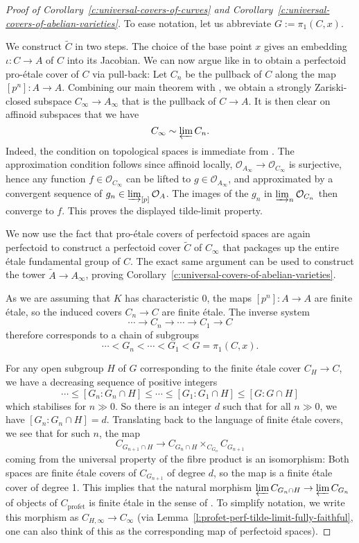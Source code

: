 \documentclass[10pt,oneside]{amsart}
\theoremstyle{definition}
\newcommand{\profet}{\operatorname{prof\acute{e}t}}
\begin{document}
\begin{proof}[Proof of Corollary~\ref{c:universal-covers-of-curves} and Corollary~\ref{c:universal-covers-of-abelian-varieties}]
To ease notation, let us abbreviate $G:=\pi_1(C,x)$.
	
We construct $\widetilde{C}$ in two steps. 
The choice of the base point $x$ gives an embedding $\iota\colon C\rightarrow A$ of $C$ into its Jacobian. We can now argue like in \cite[\S4.1]{torsion} to obtain a perfectoid pro-\'etale cover of $C$ via pull-back: Let $C_n$ be the pullback of $C$ along the map $[p^n]\colon A\rightarrow A$. Combining our main theorem with \cite[Lemma 2.2.2]{torsion}, we obtain a strongly Zariski-closed subspace $C_\infty\to A_\infty$ that is the pullback of $C\to A$. It is then clear on affinoid subspaces that we have \[C_\infty\sim \varprojlim C_n.\]
Indeed, the condition on topological spaces is immediate from \cite[Lemma 2.2.2]{torsion}. The approximation condition follows since affinoid locally, $\mathcal O_{A_\infty}\to \mathcal O_{C_\infty}$ is surjective, hence any function $f\in \mathcal O_{C_\infty}$ can be lifted to $g\in \mathcal O_{A_\infty}$, and approximated by a convergent sequence of $g_n\in\varinjlim_{[p]}\mathcal O_{A}$. The images of the $g_n$ in $\varinjlim_n\mathcal O_{C_n}$ then converge to $f$. This proves the displayed tilde-limit property.

We now use the fact that pro-\'etale covers of perfectoid spaces are again perfectoid to construct a perfectoid cover $\widetilde{C}$ of $C_\infty$ that packages up the entire \'etale fundamental group of $C$. The exact same argument can be used to construct the tower $\widetilde{A}\to A_\infty$, proving Corollary~\ref{c:universal-covers-of-abelian-varieties}.

As we are assuming that $K$ has characteristic 0, the maps $[p^n]\colon A\rightarrow A$ are finite \'etale, so the induced covers $C_n\rightarrow C$ are finite \'etale. The inverse system 
\[\cdots \rightarrow C_n \rightarrow \cdots \rightarrow C_1\rightarrow C\] 
therefore corresponds to a chain of subgroups
\[\cdots < G_n <\cdots < G_1 < G=\pi_1(C,x).\]

For any open subgroup $H$ of $G$ corresponding to the finite \'etale cover $C_H\rightarrow C$, we have a decreasing sequence of positive integers 
\[\cdots \leq [G_n:G_n\cap H] \leq \cdots \leq [G_1:G_1\cap H]\leq [G:G\cap H]\]
which stabilises for $n\gg 0$.
So there is an integer $d$ such that for all $n\gg0 $, we have $[G_n:G_n\cap H]=d$. Translating back to the language of finite \'etale covers, we see that for such $n$, the map
\[C_{G_{n+1}\cap H}\rightarrow C_{G_n\cap H}\times_{C_{G_n}} C_{G_{n+1}}\]
coming from the universal property of the fibre product is an isomorphism: Both spaces are finite \'etale covers of $C_{G_{n+1}}$ of degree $d$, so the map is a finite \'etale cover of degree 1. This implies that the natural morphism $\varprojlim C_{G_n \cap H}\rightarrow \varprojlim C_{G_n}$ of objects of $C_{\profet}$ is finite \'etale in the sense of \cite[Definition 3.9]{p-adic_Hodge}. To simplify notation, we write this morphism as $C_{H,\infty}\rightarrow C_\infty$ (via Lemma~\ref{l:profet-perf-tilde-limit-fully-faithful}, one can also think of this as the corresponding map of perfectoid spaces).


\end{proof}
\end{document}
